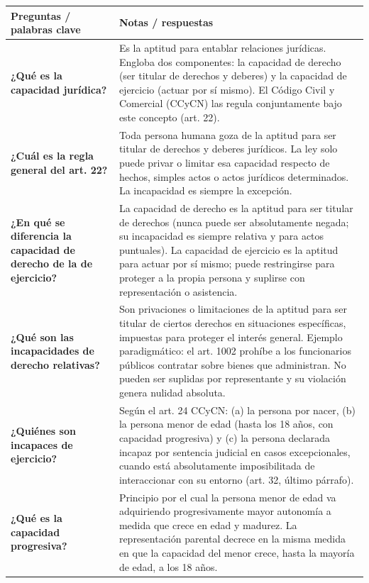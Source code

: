 \documentclass[12pt,oneside]{book}
\begin{document}
\begin{longtable}{
    >{\raggedright\arraybackslash}p{}
    >{\raggedright\arraybackslash}p{}
}
\toprule
\textbf{Preguntas / palabras clave} & \textbf{Notas / respuestas} \\
\midrule
\endhead

\textbf{¿Qué es la capacidad jurídica?} &
Es la aptitud para entablar relaciones jurídicas. Engloba dos componentes: la capacidad de derecho (ser titular de derechos y deberes) y la capacidad de ejercicio (actuar por sí mismo). El Código Civil y Comercial (CCyCN) las regula conjuntamente bajo este concepto (art. 22). \\

\textbf{¿Cuál es la regla general del art. 22?} &
Toda persona humana goza de la aptitud para ser titular de derechos y deberes jurídicos. La ley solo puede privar o limitar esa capacidad respecto de hechos, simples actos o actos jurídicos determinados. La incapacidad es siempre la excepción. \\

\textbf{¿En qué se diferencia la capacidad de derecho de la de ejercicio?} &
La capacidad de derecho es la aptitud para ser titular de derechos (nunca puede ser absolutamente negada; su incapacidad es siempre relativa y para actos puntuales). La capacidad de ejercicio es la aptitud para actuar por sí mismo; puede restringirse para proteger a la propia persona y suplirse con representación o asistencia. \\

\textbf{¿Qué son las incapacidades de derecho relativas?} &
Son privaciones o limitaciones de la aptitud para ser titular de ciertos derechos en situaciones específicas, impuestas para proteger el interés general. Ejemplo paradigmático: el art. 1002 prohíbe a los funcionarios públicos contratar sobre bienes que administran. No pueden ser suplidas por representante y su violación genera nulidad absoluta. \\

\textbf{¿Quiénes son incapaces de ejercicio?} &
Según el art. 24 CCyCN: (a) la persona por nacer, (b) la persona menor de edad (hasta los 18 años, con capacidad progresiva) y (c) la persona declarada incapaz por sentencia judicial en casos excepcionales, cuando está absolutamente imposibilitada de interaccionar con su entorno (art. 32, último párrafo). \\

\textbf{¿Qué es la capacidad progresiva?} &
Principio por el cual la persona menor de edad va adquiriendo progresivamente mayor autonomía a medida que crece en edad y madurez. La representación parental decrece en la misma medida en que la capacidad del menor crece, hasta la mayoría de edad, a los 18 años. \\


\end{longtable}
\end{document}
